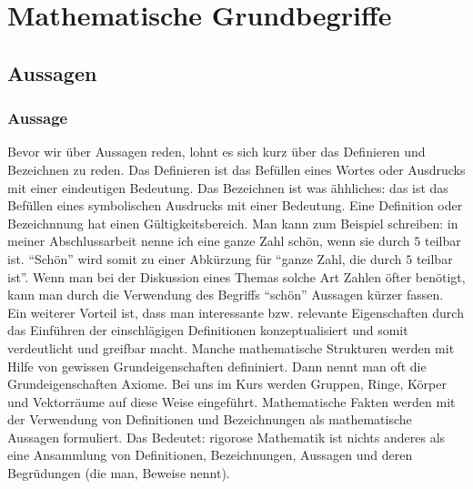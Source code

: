 \section{Mathematische Grundbegriffe}



\subsection{Aussagen}

\subsubsection{Aussage}

Bevor wir über Aussagen reden, lohnt es sich kurz über das Definieren und Bezeichnen zu reden. Das Definieren ist das Befüllen eines Wortes oder Ausdrucks mit einer eindeutigen Bedeutung. Das Bezeichnen ist was ähhliches: das ist das Befüllen eines symbolischen Ausdrucks mit einer Bedeutung. 
 Eine Definition oder Bezeichnnung hat einen Gültigkeitsbereich. Man kann zum Beispiel schreiben: in meiner Abschlussarbeit nenne ich eine ganze Zahl schön, wenn sie durch $5$ teilbar ist. ``Schön'' wird somit zu  einer Abkürzung für ``ganze Zahl, die durch $5$ teilbar ist''. Wenn man bei der Diskussion eines Themas solche Art Zahlen öfter benötigt, kann man durch die Verwendung des Begriffs ``schön'' Aussagen kürzer fassen. Ein weiterer Vorteil ist, dass man interessante bzw. relevante Eigenschaften durch das Einführen der einschlägigen Definitionen konzeptualisiert und somit verdeutlicht und greifbar macht. Manche mathematische Strukturen werden mit Hilfe von gewissen Grundeigenschaften defininiert. Dann nennt man oft die Grundeigenschaften Axiome. Bei uns im Kurs werden Gruppen, Ringe, Körper und Vektorräume auf diese Weise eingeführt. Mathematische Fakten werden mit der Verwendung von Definitionen und Bezeichnungen als mathematische Aussagen formuliert. Das Bedeutet: rigorose Mathematik ist nichts anderes als eine Ansammlung von Definitionen, Bezeichnungen, Aussagen und deren Begrüdungen (die man, Beweise nennt). 

